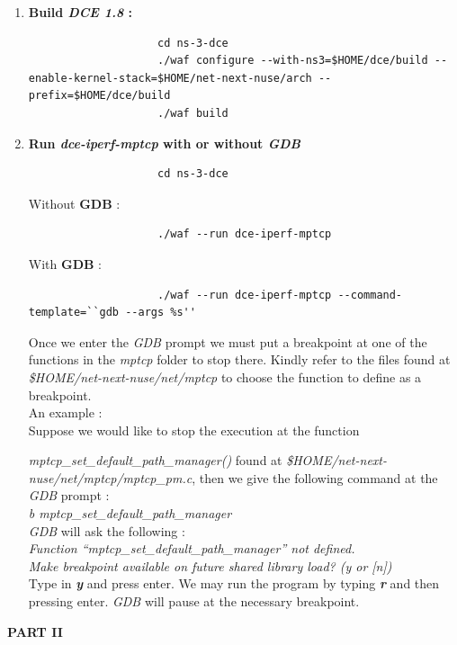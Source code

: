 \documentclass[a4paper,11pt]{article}
\begin{document}
\begin{enumerate}
			\item \textbf{Build \emph{DCE 1.8} :}
				\begin{lstlisting}
					cd ns-3-dce
					./waf configure --with-ns3=$HOME/dce/build --enable-kernel-stack=$HOME/net-next-nuse/arch --prefix=$HOME/dce/build
					./waf build
				\end{lstlisting}

			\item \textbf{Run \emph{dce-iperf-mptcp} with or without \emph{GDB}}
				\begin{lstlisting}
					cd ns-3-dce
				\end{lstlisting}
					Without \textbf{GDB} : 
				\begin{lstlisting}
					./waf --run dce-iperf-mptcp
				\end{lstlisting}
					With \textbf{GDB} :
				\begin{lstlisting}
					./waf --run dce-iperf-mptcp --command-template=``gdb --args %s''
				\end{lstlisting}
					Once we enter the \emph{GDB} prompt we must put a breakpoint at one of the functions in the \emph{mptcp} folder to stop there. Kindly refer to the files found at \emph{\$HOME/net-next-nuse/net/mptcp} to choose the function to define as a breakpoint. \\
					An example : \\
					Suppose we would like to stop the execution at the function \raggedright{\emph{mptcp\_set\_default\_path\_manager()}} found at \emph{\$HOME/net-next-nuse/net/mptcp/mptcp\_pm.c}, then we give the following command at the \emph{GDB} prompt : \\
					\emph{b mptcp\_set\_default\_path\_manager} \\
					\emph{GDB} will ask the following : \\
					\emph{Function ``mptcp\_set\_default\_path\_manager'' not defined.\\
					      Make breakpoint available on future shared library load? (y or [n])} \\
					Type in \textbf{\emph{y}} and press enter. We may run the program by typing \textbf{\emph{r}} and then pressing enter. \emph{GDB} will pause at the necessary breakpoint.
				

		\end{enumerate}






	\clearpage

	\begin{center}
		\LARGE\textbf{PART II}
	\end{center}
\end{document}
